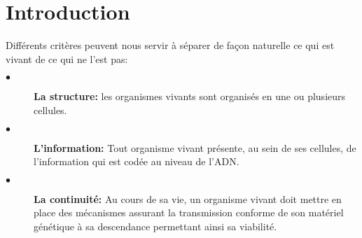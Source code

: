\chapter*{Introduction}\label{intro}

Différents critères peuvent nous servir à séparer de façon naturelle ce qui est vivant de ce qui ne l'est pas:
\begin{description}
\item[$\bullet$] \textbf{La structure:} les organismes vivants sont organisés en une ou plusieurs cellules.
\item[$\bullet$] \textbf{L'information:} Tout organisme vivant présente, au sein de ses cellules, de l'information qui est codée au niveau de l'ADN.
\item[$\bullet$] \textbf{La continuité:} Au cours de sa vie, un organisme vivant doit mettre en place des mécanismes assurant la transmission conforme de son matériel génétique à sa descendance permettant ainsi sa viabilité.
\end{description}

